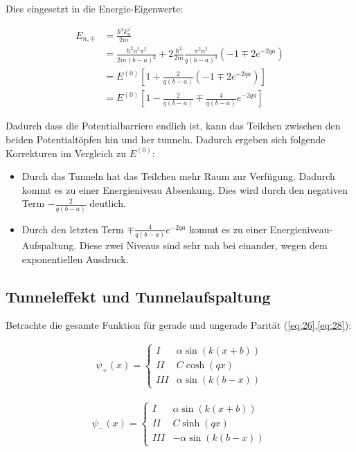 Dies eingesetzt in die Energie-Eigenwerte:

\begin{align}
  \label{eq:46}
  E_{n,\mp} &= \frac{\hbar^2 k_n^2}{2m}\\
&=  \frac{\hbar^2 n^2\pi^2}{2m(b-a)^2} + 2\frac{\hbar^2 }{2m}\frac{\pi^2 n^2}{q(b-a)^3}( -1 \mp  2e^{-2qa}) \\
&= E^{(0)}\left[1+\frac{2}{q(b-a)}( -1 \mp  2e^{-2qa})  \right] \\
&= E^{(0)}\left[1-\frac{2}{q(b-a)} \mp \frac{4}{q(b-a)}e^{-2qa}  \right]
\end{align}


Dadurch dass die Potentialbarriere endlich ist, kann das Teilchen zwischen den beiden Potentialtöpfen hin und her tunneln. Dadurch ergeben sich folgende Korrekturen im Vergleich zu \(E^{(0)}\):

\begin{itemize}
\item Durch das Tunneln hat das Teilchen mehr Raum zur Verfügung. Dadurch kommt es zu einer Energieniveau Absenkung. Dies wird durch den negativen Term \(-\frac{2}{q(b-a)} \)  deutlich.
\item Durch den letzten Term \(\mp\frac{4}{q(b-a)}e^{-2qa}   \) kommt es zu einer Energieniveau-Aufspaltung. Diese zwei Niveaus sind sehr nah bei einander, wegen dem exponentiellen Ausdruck.
\end{itemize}


\subsection{Tunneleffekt und Tunnelaufspaltung}

Betrachte die gesamte Funktion für gerade und ungerade Parität (\eqref{eq:26},\eqref{eq:28}):

\begin{align}
  \label{eq:47}
\psi_+(x) = \begin{cases}
  I & \alpha \sin(k(x+b)) \\
  II & C\cosh(qx) \qquad  \\
 III & \alpha \sin(k(b-x))
\end{cases}
\end{align}

\begin{align}
  \label{eq:48}
\psi_-(x) = \begin{cases}
  I & \alpha \sin(k(x+b)) \\
  II & C\sinh(qx)  \\
 III & -\alpha \sin(k(b-x))
\end{cases}
\end{align}




